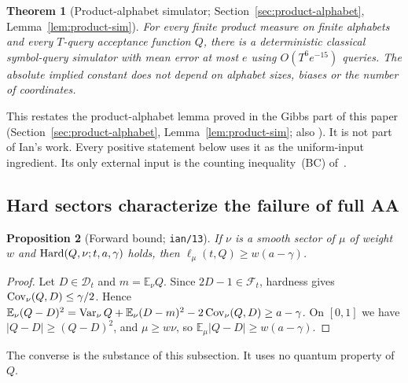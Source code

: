 \documentclass[11pt]{article}
\newtheorem{theorem}{Theorem}[section]
\newtheorem{proposition}[theorem]{Proposition}
\theoremstyle{definition}\newtheorem{definition}[theorem]{Definition}
\theoremstyle{remark}\newtheorem{remark}[theorem]{Remark}
\newcommand{\E}{\mathbb E}\newcommand{\Prb}{\mathbb P}
\newcommand{\mc}{\mathcal}\newcommand{\eps}{\varepsilon}
\begin{document}
\begin{theorem}[Product-alphabet simulator; Section~\ref{sec:product-alphabet}, Lemma~\ref{lem:product-sim}]\label{dist:product-sim}
For every finite product measure on finite alphabets and every \(T\)-query
acceptance function \(Q\), there is a deterministic classical symbol-query
simulator with mean error at most \(e\) using \(O(T^6e^{-15})\) queries. The
absolute implied constant does not depend on alphabet sizes, biases or the
number of coordinates.
\end{theorem}
This restates the product-alphabet lemma proved in the Gibbs part of this
paper (Section~\ref{sec:product-alphabet}, Lemma~\ref{lem:product-sim}; also
). It is not part of Ian's work.
Every positive statement below uses it as the uniform-input ingredient. Its only
external input is the counting inequality~(BC) of~\cite{HMP26}.

\subsection{Hard sectors characterize the failure of full AA}\label{dist:sectors}

\begin{proposition}[Forward bound; \texttt{ian/13}]\label{dist:forward}
If \(\nu\) is a smooth sector of \(\mu\) of weight \(w\) and
\(\operatorname{Hard}(Q,\nu;t,a,\gamma)\) holds, then \(\ell_\mu(t,Q)\ge w(a-\gamma)\).
\end{proposition}
\begin{proof}
Let \(D\in\mc D_t\) and \(m=\E_\nu Q\). Since \(2D-1\in\mc F_t\), hardness gives
\(\operatorname{Cov}_\nu(Q,D)\le\gamma/2\). Hence
\(\E_\nu(Q-D)^2=\Var_\nu Q+\E_\nu(D-m)^2-2\Cov_\nu(Q,D)\ge a-\gamma\). On
\([0,1]\) we have \(|Q-D|\ge(Q-D)^2\), and \(\mu\ge w\nu\), so
\(\E_\mu|Q-D|\ge w(a-\gamma)\).
\end{proof}
The converse is the substance of this subsection. It uses no quantum property
of \(Q\).
\end{document}
